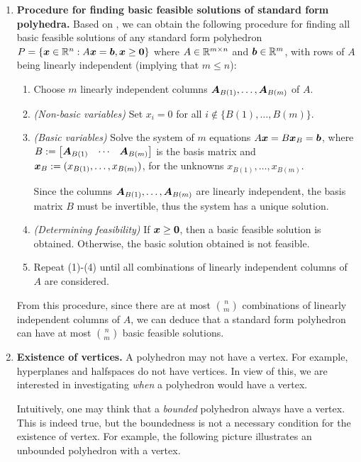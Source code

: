 \begin{enumerate}
\item \label{it:std-form-bfs-procedure} \textbf{Procedure for finding
basic feasible solutions of standard form polyhedra.} Based on
, we can obtain the following procedure
for finding all basic feasible solutions of any standard form polyhedron
\(P=\{\bm{x}\in\mathbb{R}^n:A\bm{x}=\bm{b},\bm{x}\ge\bm{0}\}\) where
\(A\in\mathbb{R}^{m\times n}\) and \(\bm{b}\in\mathbb{R}^{m}\), with rows of \(A\) being
linearly independent (implying that \(m\le n\)):
\begin{enumerate}[label={(\arabic*)}]
\item Choose \(m\) linearly independent columns \(\bm{A}_{B(1)},\dotsc,\bm{A}_{B(m)}\) of \(A\).
\item \emph{(Non-basic variables)} Set \(x_i=0\) for all \(i\notin\{B(1),\dotsc,B(m)\}\).
\item \emph{(Basic variables)} Solve the system of \(m\) equations
\(A\bm{x}=B\bm{x}_{B}=\bm{b}\), where
\(B:=\begin{bmatrix}\bm{A}_{B(1)}&\cdots&\bm{A}_{B(m)}\end{bmatrix} \) is
the basis matrix and \(\bm{x}_{B}:=(x_{B(1)},\dotsc,x_{B(m)})\), for the unknowns
\(x_{B(1)},\dotsc,x_{B(m)}\). \begin{note}
Since the columns \(\bm{A}_{B(1)},\dotsc,\bm{A}_{B(m)}\) are linearly
independent, the basis matrix \(B\) must be invertible, thus the system has a
unique solution.
\end{note}
\item \emph{(Determining feasibility)} If \(\bm{x}\ge\bm{0}\), then a basic
feasible solution is obtained. Otherwise, the basic solution obtained is not
feasible.
\item Repeat (1)-(4) until all combinations of linearly independent columns of
\(A\) are considered.
\end{enumerate}
From this procedure, since there are at most \(\binom{n}{m}\) combinations of
linearly independent columns of \(A\), we can deduce that a standard form
polyhedron can have at most \(\binom{n}{m}\) basic feasible solutions.

\item \textbf{Existence of vertices.} A polyhedron may not have a vertex. For
example, hyperplanes and halfspaces do not have vertices. In view of this, we
are interested in investigating \emph{when} a polyhedron would have a vertex.

Intuitively, one may think that a \emph{bounded} polyhedron always have a
vertex. This is indeed true, but the boundedness is not a necessary condition
for the existence of vertex. For example, the following picture illustrates an
unbounded polyhedron with a vertex.
\begin{center}
\end{center}


\end{enumerate}
